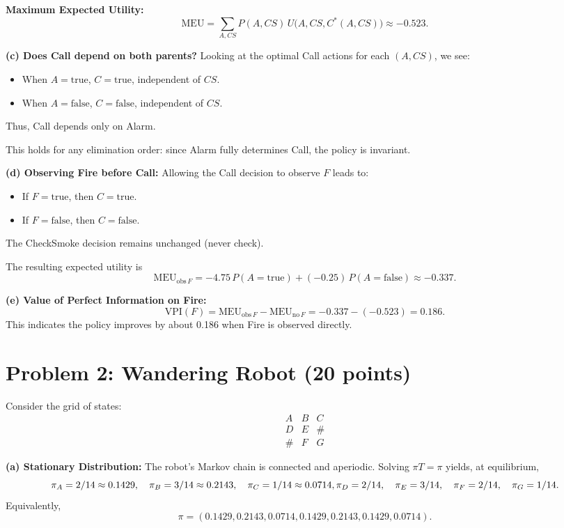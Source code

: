 \documentclass[11pt]{article}
\begin{document}
\medskip
\noindent\textbf{Maximum Expected Utility:}
\[
  \mathrm{MEU} = \sum_{A,CS} P(A,CS)\,U\bigl(A,CS,C^*(A,CS)\bigr) \approx -0.523.
\]

\bigskip
\textbf{(c) Does Call depend on both parents?}
Looking at the optimal Call actions for each $(A,CS)$, we see:
\begin{itemize}[nosep]
  \item When $A=\mathrm{true}$, $C=\mathrm{true}$, independent of $CS$.
  \item When $A=\mathrm{false}$, $C=\mathrm{false}$, independent of $CS$.
\end{itemize}
Thus, Call depends only on Alarm.

This holds for any elimination order: since Alarm fully determines Call, the policy is invariant.

\bigskip
\textbf{(d) Observing Fire before Call:}
Allowing the Call decision to observe $F$ leads to:
\begin{itemize}[nosep]
  \item If $F=\mathrm{true}$, then $C=\mathrm{true}$.
  \item If $F=\mathrm{false}$, then $C=\mathrm{false}$.
\end{itemize}
The CheckSmoke decision remains unchanged (never check).

The resulting expected utility is
\[
  \mathrm{MEU}_{\mathrm{obs}\,F} = -4.75\,P(A=\mathrm{true}) + (-0.25)\,P(A=\mathrm{false}) \approx -0.337.
\]

\bigskip
\textbf{(e) Value of Perfect Information on Fire:}
\[
  \mathrm{VPI}(F) = \mathrm{MEU}_{\mathrm{obs}\,F} - \mathrm{MEU}_{\mathrm{no}\,F} = -0.337 - (-0.523) = 0.186.
\]
This indicates the policy improves by about 0.186 when Fire is observed directly.

\section*{Problem 2: Wandering Robot (20 points)}

Consider the grid of states:
\[
\begin{matrix}
A & B & C\\
D & E & \#\\
\# & F & G
\end{matrix}
\]

\textbf{(a) Stationary Distribution:}
The robot’s Markov chain is connected and aperiodic. Solving \(\pi T = \pi\) yields, at equilibrium,
\[
  \pi_A = 2/14 \approx 0.1429,\quad
  \pi_B = 3/14 \approx 0.2143,\quad
  \pi_C = 1/14 \approx 0.0714,\\
  \pi_D = 2/14,\quad
  \pi_E = 3/14,\quad
  \pi_F = 2/14,\quad
  \pi_G = 1/14.
\]
Equivalently,
\[
  \pi = (0.1429,0.2143,0.0714,0.1429,0.2143,0.1429,0.0714).
\]
\end{document}
